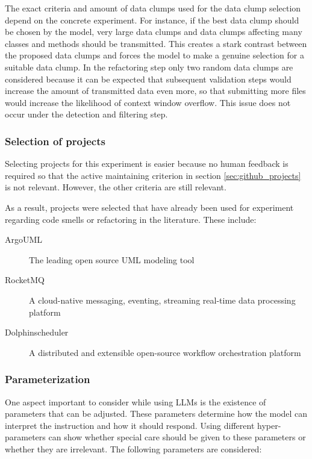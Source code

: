The exact criteria and amount of data clumps used for the data clump selection depend on the concrete experiment. For instance, if the best data clump should be chosen by the model, very large data clumps and data clumps affecting many classes and methods should be transmitted. This creates a stark contrast between the proposed data clumps and forces the model to make a genuine selection for a suitable data clump. In the refactoring step only two random data clumps are considered  because it can be expected that subsequent validation steps would increase the amount of transmitted data even more, so that submitting more files would increase the likelihood of context window overflow. This issue does not occur under the detection and filtering step. 

\subsubsection{Selection of projects}

Selecting projects for this experiment is easier because no human feedback is required so that the active maintaining criterion in section \ref{sec:github_projects} is not relevant. However, the other criteria are still relevant. 

As a result, projects were selected that have already been used for experiment regarding code smells or refactoring in the literature. These include:
\begin{description}
    \item[ArgoUML] The leading open source UML modeling tool
    \item[RocketMQ] A cloud-native messaging, eventing, streaming real-time data processing platform
    \item[Dolphinscheduler] A distributed and extensible open-source workflow orchestration platform
\end{description}


\subsubsection{Parameterization}

One aspect important to consider while using \acp{LLM} is the existence of parameters that can be adjusted. These parameters determine how the model can interpret the instruction and how it should respond. Using different hyper-parameters can show whether special care should be given to these parameters or whether they are irrelevant. The following parameters are considered: 

